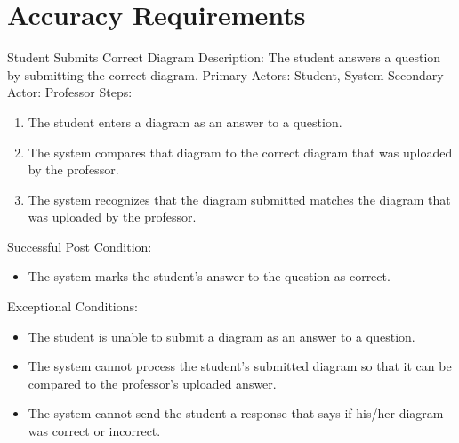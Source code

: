 
\chapter{Accuracy Requirements}

    \begin{section}{Student Submits Correct Diagram}
        Description: The student answers a question by submitting the correct diagram. \newline
        Primary Actors: Student, System \newline
        Secondary Actor: Professor \newline
        Steps:
        \begin{enumerate}
            \item{The student enters a diagram as an answer to a question.}
            \item{The system compares that diagram to the correct diagram that was uploaded by the professor.}
            \item{The system recognizes that the diagram submitted matches the diagram that was uploaded by the professor.}
        \end{enumerate}
        Successful Post Condition:
        \begin{itemize}
            \item{The system marks the student’s answer to the question as correct.} 
        \end{itemize}
        Exceptional Conditions:
        \begin{itemize}
            \item{The student is unable to submit a diagram as an answer to a question.}
            \item{The system cannot process the student’s submitted diagram so that it can be compared to the professor’s uploaded answer.}
            \item{The system cannot send the student a response that says if his/her diagram was correct or incorrect.}
        \end{itemize}
    \end{section}

